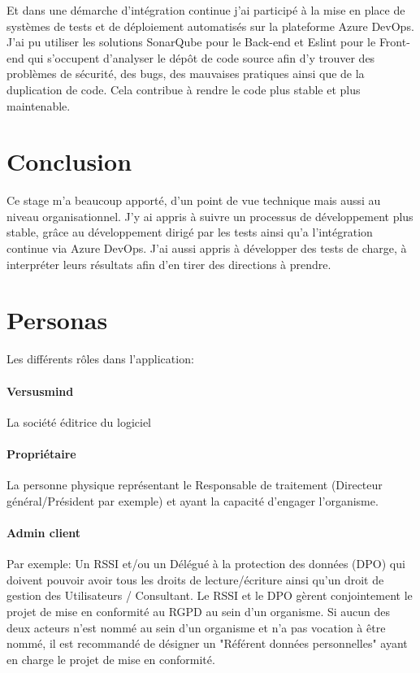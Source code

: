 \documentclass[12pt, a4paper]{report}
\begin{document}
        Et dans une démarche d'intégration continue j'ai participé à la mise en place de systèmes de tests et de déploiement automatisés sur la plateforme Azure DevOps.\newline
        J'ai pu utiliser les solutions SonarQube pour le Back-end et Eslint pour le Front-end qui s'occupent d'analyser le dépôt de code source afin d'y trouver des problèmes de sécurité, des bugs, des mauvaises pratiques ainsi que de la duplication de code.\newline
        Cela contribue à rendre le code plus stable et plus maintenable.\newline
\chapter{Conclusion}
    Ce stage m'a beaucoup apporté, d'un point de vue technique mais aussi au niveau organisationnel.\newline
    J'y ai appris à suivre un processus de développement plus stable, grâce au développement dirigé par les tests ainsi qu'a l'intégration continue via Azure DevOps.\newline
    J'ai aussi appris à développer des tests de charge, à interpréter leurs résultats afin d'en tirer des directions à prendre.\newline
\makeutbmbackcover{}
\appendix
\chapter{Personas}
    Les différents rôles dans l'application:
    \subsubsection{Versusmind}
        La société éditrice du logiciel
    \subsubsection{Propriétaire}
        La personne physique représentant le Responsable de traitement (Directeur général/Président par exemple) et ayant la capacité d'engager l'organisme.
    \subsubsection{Admin client}
        Par exemple: Un RSSI et/ou un Délégué à la protection des données (DPO) qui doivent pouvoir avoir tous les droits de lecture/écriture ainsi qu'un droit de gestion des Utilisateurs / Consultant.\newline
        Le RSSI et le DPO gèrent conjointement le projet de mise en conformité au RGPD au sein d'un organisme.\newline
        Si aucun des deux acteurs n'est nommé au sein d'un organisme et n'a pas vocation à être nommé, il est recommandé de désigner un "Référent données personnelles" ayant en charge le projet de mise en conformité.
    \newpage
\end{document}
